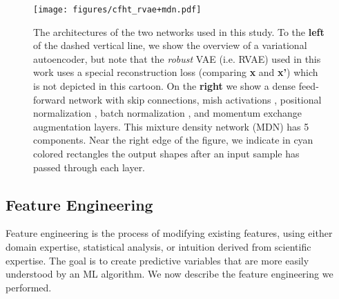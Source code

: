 \begin{figure*}
   \centering
   \texttt{[image: figures/cfht\_rvae+mdn.pdf]}
   \caption{The architectures of the two networks used in this study. To the \textbf{left} of the dashed vertical line, we show the overview of a variational autoencoder, but note that the \textit{robust} VAE (i.e. RVAE) used in this work uses a special reconstruction loss (comparing \textbf{x} and \textbf{x'}) which is not depicted in this cartoon. On the \textbf{right} we show a dense feed-forward network with skip connections, mish activations \citep{mish_activation}, positional normalization \citep{positional_normalization_pono}, batch normalization \citep{batchnorm},  %
   and momentum exchange \citep{moex} augmentation layers. This mixture density network (MDN) has 5 components. Near the right edge of the figure, we indicate in cyan colored rectangles the output shapes after an input sample has passed through each layer.}%
   \label{fig:rvae_plus_mdn}
\end{figure*}

\subsection{Feature Engineering}
\label{sec:feature_engineering}
Feature engineering is the process of modifying existing features, using either domain expertise, statistical analysis, or intuition derived from scientific expertise.  The goal is to create predictive variables that are more easily understood by an ML algorithm. We now describe the feature engineering we performed. %

